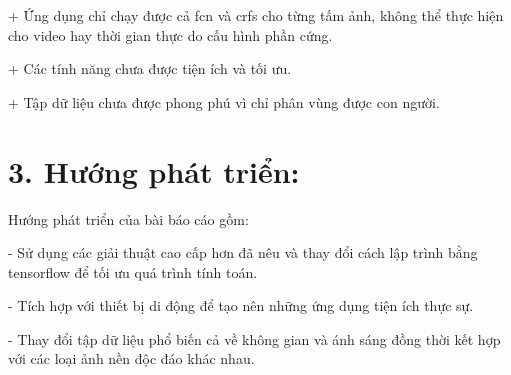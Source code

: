 \documentclass[../the.tex]{subfiles}
\begin{document}
	+ Ứng dụng chỉ chạy được cả \gls{fcn} và \gls{crfs} cho từng tấm ảnh, không thể thực hiện cho video hay thời gian thực do cấu hình phần cứng.
	
	+ Các tính năng chưa được tiện ích và tối ưu.
	
	+	Tập dữ liệu chưa được phong phú vì chỉ phân vùng được con người.

\bigskip

\section*{3. Hướng phát triển:}
\label{develop}
Hướng phát triển của bài báo cáo gồm:

	-	Sử dụng các giải thuật cao cấp hơn đã nêu và thay đổi cách lập trình bằng tensorflow để tối ưu quá trình tính toán.
	
	-	Tích hợp với thiết bị di động để tạo nên những ứng dụng tiện ích thực sự.
	
	-	Thay đổi tập dữ liệu phổ biến cả về không gian và ánh sáng đồng thời kết hợp với các loại ảnh nền độc đáo khác nhau.
\bigskip
	
\end{document}

